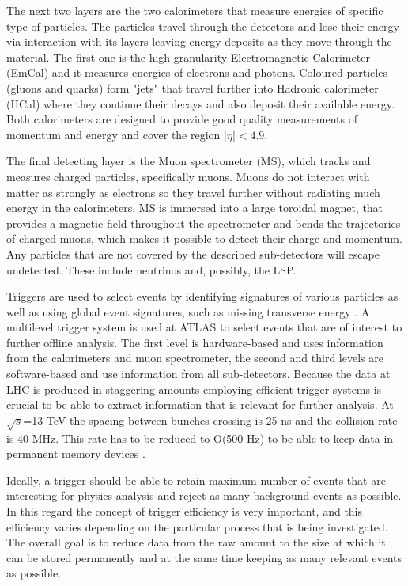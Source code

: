 The next two layers are the two calorimeters that measure energies of specific type of particles. The particles travel through the detectors and lose their energy via interaction with its layers leaving energy deposits as they move through the material. 
The first one is the high-granularity Electromagnetic Calorimeter (EmCal) and it measures energies of electrons and photons. Coloured particles (gluons and quarks) form "jets" that travel further into Hadronic calorimeter (HCal) where they continue their decays and also deposit their available energy.
Both calorimeters are  designed to provide good quality measurements of momentum and energy and cover the region $|\eta|<4.9$.

The final detecting layer is the Muon spectrometer (MS), which tracks and measures charged particles, specifically muons. Muons do not interact with matter as strongly as electrons so they travel further without radiating much energy in the calorimeters.
MS is immersed into a large toroidal magnet, that provides a magnetic field throughout the spectrometer and bends the trajectories of charged muons, which makes it possible to detect their charge and momentum. Any particles that are not covered by the described sub-detectors will escape undetected. These include neutrinos and, possibly, the LSP. 

Triggers are used to select events by identifying signatures of various particles as well as using global event signatures, such as missing transverse energy \citep{aad2012performance}. A multilevel trigger system is used at ATLAS to select events that are of interest to further offline analysis. 
The  first  level is hardware-based and uses information from the calorimeters and muon spectrometer, the second and third levels are software-based and use information from all sub-detectors. Because the data at LHC is produced in staggering amounts employing efficient trigger systems is crucial to be able to extract information that is relevant for further analysis. At $\sqrt{s}$=13 TeV the spacing between bunches crossing is 25 ns and the collision rate is 40 MHz. This rate has to be reduced to O(500 Hz) to be able to keep data in permanent memory devices \citep{barr2015particle}.

Ideally, a trigger should be able to retain maximum number of events that are interesting for physics analysis and reject as many background events as possible. In this regard the concept of trigger efficiency is very important, and this efficiency varies depending on the particular process that is being investigated. The overall goal is to reduce data from the raw amount to the size at which it can be stored permanently and at the same time keeping  as many relevant events as possible. 

